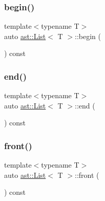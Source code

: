 \mbox{\label{structast_1_1_list_a93043c9c49ddedcaa697874e86c65b4e}} 
\subsubsection{\texorpdfstring{begin()}{begin()}}
{\footnotesize\ttfamily template$<$typename T$>$ \\
auto \hyperlink{structast_1_1_list}{ast\+::\+List}$<$ T $>$\+::begin (\begin{DoxyParamCaption}{ }\end{DoxyParamCaption}) const\hspace{0.3cm}{\ttfamily [inline]}}

\mbox{\label{structast_1_1_list_a7fda278b899341ea4c8fe28daae76a2d}} 
\subsubsection{\texorpdfstring{end()}{end()}}
{\footnotesize\ttfamily template$<$typename T$>$ \\
auto \hyperlink{structast_1_1_list}{ast\+::\+List}$<$ T $>$\+::end (\begin{DoxyParamCaption}{ }\end{DoxyParamCaption}) const\hspace{0.3cm}{\ttfamily [inline]}}

\mbox{\label{structast_1_1_list_ad9cc5344ebc6aee71875b407a24093f1}} 
\subsubsection{\texorpdfstring{front()}{front()}}
{\footnotesize\ttfamily template$<$typename T$>$ \\
auto \hyperlink{structast_1_1_list}{ast\+::\+List}$<$ T $>$\+::front (\begin{DoxyParamCaption}{ }\end{DoxyParamCaption}) const\hspace{0.3cm}{\ttfamily [inline]}}

\mbox{\label{structast_1_1_list_ab054fddb258a6d0af1ce53e8b8dd6e27}} 
